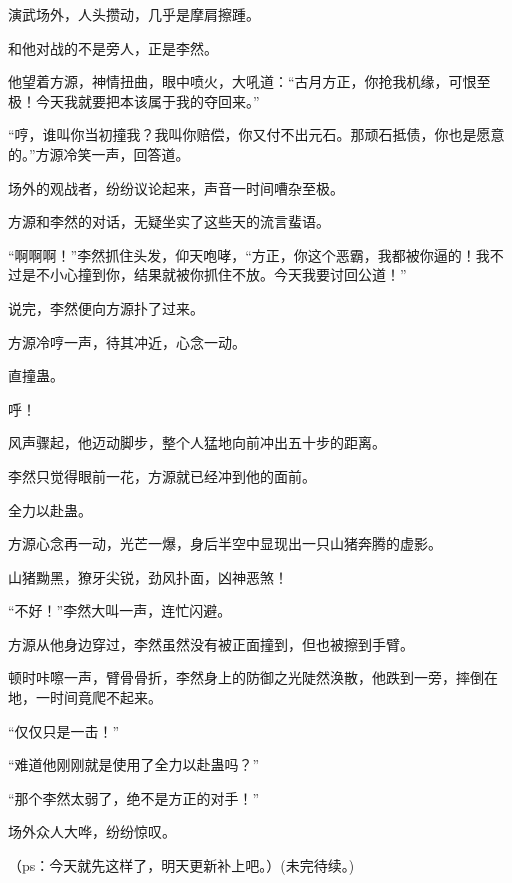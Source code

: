 \begin{this_body}
演武场外，人头攒动，几乎是摩肩擦踵。

和他对战的不是旁人，正是李然。

他望着方源，神情扭曲，眼中喷火，大吼道：“古月方正，你抢我机缘，可恨至极！今天我就要把本该属于我的夺回来。”

“哼，谁叫你当初撞我？我叫你赔偿，你又付不出元石。那顽石抵债，你也是愿意的。”方源冷笑一声，回答道。

场外的观战者，纷纷议论起来，声音一时间嘈杂至极。

方源和李然的对话，无疑坐实了这些天的流言蜚语。

“啊啊啊！”李然抓住头发，仰天咆哮，“方正，你这个恶霸，我都被你逼的！我不过是不小心撞到你，结果就被你抓住不放。今天我要讨回公道！”

说完，李然便向方源扑了过来。

方源冷哼一声，待其冲近，心念一动。

直撞蛊。

呼！

风声骤起，他迈动脚步，整个人猛地向前冲出五十步的距离。

李然只觉得眼前一花，方源就已经冲到他的面前。

全力以赴蛊。

方源心念再一动，光芒一爆，身后半空中显现出一只山猪奔腾的虚影。

山猪黝黑，獠牙尖锐，劲风扑面，凶神恶煞！

“不好！”李然大叫一声，连忙闪避。

方源从他身边穿过，李然虽然没有被正面撞到，但也被擦到手臂。

顿时咔嚓一声，臂骨骨折，李然身上的防御之光陡然涣散，他跌到一旁，摔倒在地，一时间竟爬不起来。

“仅仅只是一击！”

“难道他刚刚就是使用了全力以赴蛊吗？”

“那个李然太弱了，绝不是方正的对手！”

场外众人大哗，纷纷惊叹。

（ps：今天就先这样了，明天更新补上吧。）(未完待续。)

\end{this_body}

